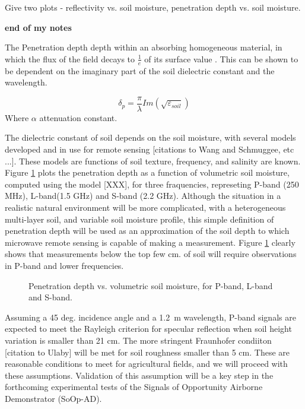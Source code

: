 \documentclass[draftcls,onecolumn]{IEEEtran}  %
\begin{document}
Give two plots - reflectivity vs. soil moisture,  penetration depth vs. soil moisture. 

\bf end of my notes \rm 

The Penetration depth depth within an absorbing homogeneous material, in which the flux  of the field decays to $\frac{1}{e}$ of its surface value \cite{Ulaby:1981}. 
This can be shown to be dependent on the imaginary part of the soil dielectric constant and the wavelength. 

\begin{equation}
  \delta_p  = \frac{\pi}{\lambda} Im(\sqrt{\varepsilon_{soil}})
\end{equation}
Where  $\alpha$ attenuation constant.

The dielectric constant of soil depends on the soil moisture, with several models developed and in use for remote sensing [citations to Wang and Schmuggee, etc ...].
These models are functions of soil texture, frequency, and salinity are known. 
Figure \ref{fig:depth} plots the penetration depth as a function of volumetric soil moisture, computed using the model [XXX], for three fraquencies, represeting P-band (250 MHz), L-band(1.5 GHz) and S-band (2.2 GHz). 
Although the situation in a realistic  natural environment will be more complicated, with a heterogeneous multi-layer soil, and variable soil moisture profile, this simple definition of penetration depth will be used as an approximation of the soil depth to which microwave remote sensing is capable of making a measurement.  Figure \ref{fig:depth} clearly shows that measurements below the top few cm. of soil will require observations in P-band and lower frequencies. 

\begin{figure}[!t]
	\centering
	\caption{Penetration depth vs. volumetric soil moisture, for P-band, L-band and S-band.}
    \centering
	\label{fig:depth}
\end{figure}

Assuming a 45 deg. incidence angle and a 1.2~m wavelength,  P-band signals are expected to meet the Rayleigh criterion for specular reflection when soil height variation is smaller than 21 cm. The more stringent Fraunhofer condiiton [citation to Ulaby] will be met for soil roughness smaller than 5 cm.  These are reasonable conditions to meet for agricultural fields, and we will proceed with these assumptions. 
Validation of this assumption will be a key step in the forthcoming experimental tests of the Signals of Opportunity Airborne Demonstrator (SoOp-AD). 
\end{document}
